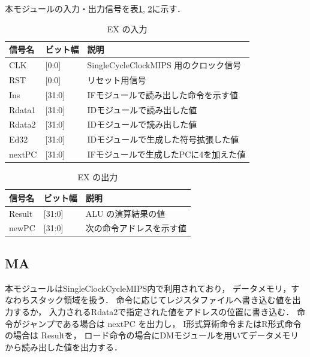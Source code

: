 本モジュールの入力・出力信号を表\ref{tab:ex_input}, \ref{tab:ex_output}に示す．
\begin{table}[h]
  \caption{EX の入力}
  \centering
  \begin{tabular}{l|l|l}
    信号名 & ビット幅 & 説明 \\
    \hline
    CLK & [0:0] & SingleCycleClockMIPS 用のクロック信号 \\
    RST & [0:0] & リセット用信号 \\
    Ins & [31:0] & IFモジュールで読み出した命令を示す値 \\
    Rdata1 & [31:0] & IDモジュールで読み出した値 \\
    Rdata2 & [31:0] & IDモジュールで読み出した値 \\
    Ed32 & [31:0] & IDモジュールで生成した符号拡張した値 \\
    nextPC & [31:0] & IFモジュールで生成したPCに4を加えた値 \\
  \end{tabular}
  \label{tab:ex_input}
\end{table}
\begin{table}[h]
  \caption{EX の出力}
  \centering
  \begin{tabular}{l|l|l}
    信号名 & ビット幅 & 説明 \\
    \hline
    Result & [31:0] & ALU の演算結果の値 \\
    newPC & [31:0] & 次の命令アドレスを示す値 \\
  \end{tabular}
  \label{tab:ex_output}
\end{table}

\subsection{MA}
本モジュールはSingleClockCycleMIPS内で利用されており，
データメモリ，すなわちスタック領域を扱う．
命令に応じてレジスタファイルへ書き込む値を出力するか，
入力されるRdata2で指定された値をアドレスの位置に書き込む．
命令がジャンプである場合は nextPC を出力し，
I形式算術命令またはR形式命令の場合は Resultを，
ロード命令の場合にDMモジュールを用いてデータメモリから読み出した値を出力する．

